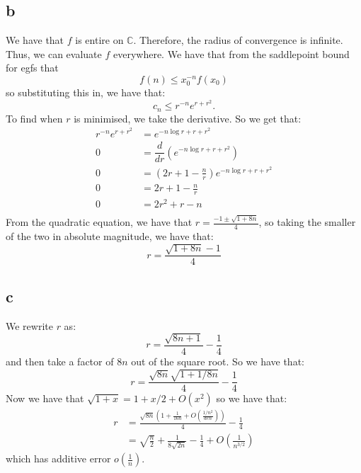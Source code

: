 \documentclass[]{article}
\begin{document}
\subsection{b}
We have that $f$ is entire on $\mathbb{C}$. Therefore, the radius of convergence is infinite. Thus, we can evaluate $f$ everywhere. We have that from the saddlepoint bound for egfs that
\begin{equation}
	[x^n] f(n) \leq x_0^{-n} f(x_0)
\end{equation}
so substituting this in, we have that:
\begin{equation}
	c_n \leq r^{-n} e^{r + r^2}.
\end{equation}
To find when $r$ is minimised, we take the derivative. So we get that:
\begin{align*}
	 r^{-n} e^{r + r^2} &= e^{-n \log r + r + r^2}\\
	 0 &= \dfrac{d}{dr}(e^{-n \log r + r + r^2}) \\
	 0 &= \left(2r + 1 - \frac{n}{r}\right) e^{-n \log r + r + r^2}\\
	 0 &= 2r + 1 - \frac{n}{r}\\
	 0 &= 2r^2 + r - n\\
\end{align*}
From the quadratic equation, we have that $r = \frac{-1 \pm \sqrt{1 + 8n}}{4}$, so taking the smaller of the two in absolute magnitude, we have that:
\begin{equation}
	r = \frac{\sqrt{1 + 8n} - 1}{4}
\end{equation}

\subsection{c}
We rewrite $r$ as:
\begin{equation}
	r = \frac{\sqrt{8n + 1}}{4} - \frac{1}{4}
\end{equation}
and then take a factor of $8n$ out of the square root. So we have that:
\begin{equation}
	r = \frac{\sqrt{8n}\sqrt{1+ 1/8n}}{4} - \frac{1}{4}
\end{equation}
Now we have that $\sqrt{1 + x} = 1 + x/2 + O(x^2)$ so we have that:
\begin{align*}
	r &= \frac{\sqrt{8n}\left(1 + \frac{1}{16n} + O(\frac{1/n^2}{den})\right)}{4} - \frac{1}{4}\\
	&= \sqrt{\frac{n}{2}} + \frac{1}{8 \sqrt{2 n}} - \frac{1}{4} + O(\frac{1}{n^{3/2}})
\end{align*}
which has additive error $o(\frac{1}{n})$. 
\end{document}
